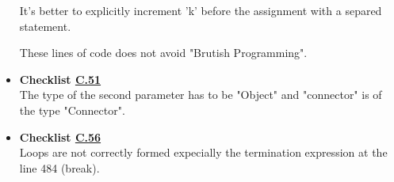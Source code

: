 \documentclass[../../../../codeInspection.tex]{subfiles}
\begin{document}
\begin{itemize}
		          

		          It's better to explicitly increment 'k' before the assignment with a separed statement.

		          These lines of code does not avoid "Brutish Programming".

		    \item \textbf{Checklist \hyperref[C:51]{C.51}} \\

		    	  

		    	  The type of the second parameter has to be "Object" and "connector" is of the type "Connector".

		    \item \textbf{Checklist \hyperref[C:56]{C.56}} \\

		    	  

		    	  Loops are not correctly formed expecially the termination expression at the line 484 (break).

		\end{itemize}
\end{document}
